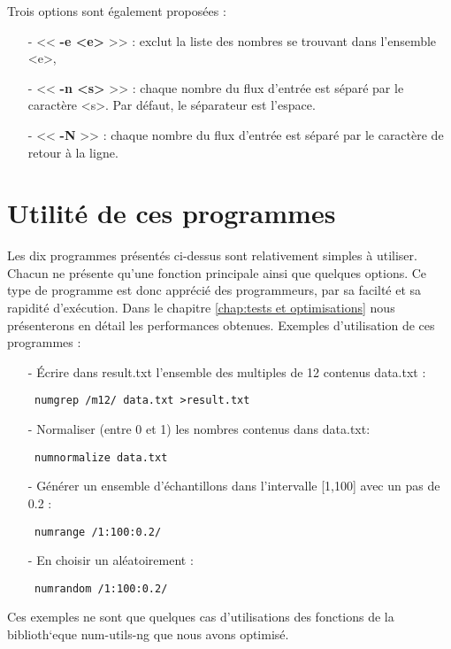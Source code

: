 \begin{itemize}
Trois options sont \'egalement propos\'ees :
\begin{itemize}
 \item[-] << \textbf{-e <e>} >> : exclut la liste des nombres se trouvant dans l'ensemble <e>,
 \item[-] << \textbf{-n <s>} >> : chaque nombre du flux d'entr\'ee est s\'epar\'e par le caract\`ere <s>. Par d\'efaut, le s\'eparateur est l'espace.
 \item[-] << \textbf{-N} >> : chaque nombre du flux d'entr\'ee est s\'epar\'e par le caract\`ere de retour \`a la ligne.
\end{itemize}
\end{itemize}

\section{Utilit\'e de ces programmes}

Les dix programmes pr\'esent\'es ci-dessus sont relativement simples \`a utiliser. Chacun ne pr\'esente qu'une fonction principale ainsi que quelques options.
Ce type de programme est donc appr\'eci\'e des programmeurs, par sa facilt\'e et sa rapidit\'e d'ex\'ecution. Dans le chapitre \ref{chap:tests et optimisations}
nous pr\'esenterons en d\'etail les performances obtenues.
\newline
Exemples d'utilisation de ces programmes :
\begin{itemize}
 \item[-] \'Ecrire dans result.txt l'ensemble des multiples de 12 contenus data.txt :
 \begin{verbatim} numgrep /m12/ data.txt >result.txt \end{verbatim}
 \item[-] Normaliser (entre 0 et 1) les nombres contenus dans data.txt:
 \begin{verbatim} numnormalize data.txt \end{verbatim}
 \item[-] G\'en\'erer un ensemble d'\'echantillons dans l'intervalle [1,100] avec un pas de 0.2 :
 \begin{verbatim} numrange /1:100:0.2/ \end{verbatim}
 \item[-] En choisir un al\'eatoirement :
 \begin{verbatim} numrandom /1:100:0.2/ \end{verbatim}
\end{itemize}

Ces exemples ne sont que quelques cas d'utilisations des fonctions de la biblioth`eque num-utils-ng que nous avons optimis\'e.


